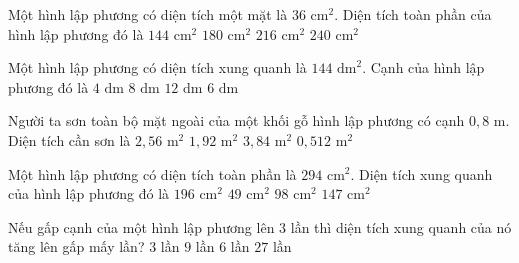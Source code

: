 \begin{ex} %
Một hình lập phương có diện tích một mặt là $36\text{ cm}^2$. Diện tích toàn phần của hình lập phương đó là
\choice
{$144\text{ cm}^2$}
{$180\text{ cm}^2$}
{\True $216\text{ cm}^2$}
{$240\text{ cm}^2$}
\end{ex}

\begin{ex} %
Một hình lập phương có diện tích xung quanh là $144\text{ dm}^2$. Cạnh của hình lập phương đó là
\choice
{$4\text{ dm}$}
{$8\text{ dm}$}
{$12\text{ dm}$}
{\True $6\text{ dm}$}
\end{ex}

\begin{ex} %
Người ta sơn toàn bộ mặt ngoài của một khối gỗ hình lập phương có cạnh $0{,}8\text{ m}$. Diện tích cần sơn là
\choice
{$2{,}56\text{ m}^2$}
{$1{,}92\text{ m}^2$}
{\True $3{,}84\text{ m}^2$}
{$0{,}512\text{ m}^2$}
\end{ex}

\begin{ex} %
Một hình lập phương có diện tích toàn phần là $294\text{ cm}^2$. Diện tích xung quanh của hình lập phương đó là
\choice
{\True $196\text{ cm}^2$}
{$49\text{ cm}^2$}
{$98\text{ cm}^2$}
{$147\text{ cm}^2$}
\end{ex}

\begin{ex} %
Nếu gấp cạnh của một hình lập phương lên $3$ lần thì diện tích xung quanh của nó tăng lên gấp mấy lần?
\choice
{$3$ lần}
{\True $9$ lần}
{$6$ lần}
{$27$ lần}
\end{ex}

